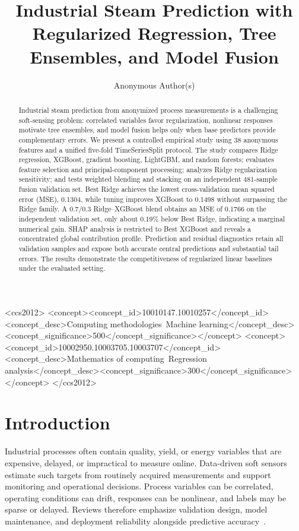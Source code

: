 \documentclass[sigconf,screen,review,anonymous]{acmart}
\title{Industrial Steam Prediction with Regularized Regression, Tree Ensembles, and Model Fusion}
\author{Anonymous Author(s)}
\begin{document}
\begin{abstract}
Industrial steam prediction from anonymized process measurements is a challenging soft-sensing problem: correlated variables favor regularization, nonlinear responses motivate tree ensembles, and model fusion helps only when base predictors provide complementary errors. We present a controlled empirical study using 38 anonymous features and a unified five-fold TimeSeriesSplit protocol. The study compares Ridge regression, XGBoost, gradient boosting, LightGBM, and random forests; evaluates feature selection and principal-component processing; analyzes Ridge regularization sensitivity; and tests weighted blending and stacking on an independent 481-sample fusion validation set. Best Ridge achieves the lowest cross-validation mean squared error (MSE), 0.1304, while tuning improves XGBoost to 0.1498 without surpassing the Ridge family. A 0.7/0.3 Ridge--XGBoost blend obtains an MSE of 0.1766 on the independent validation set, only about 0.19\% below Best Ridge, indicating a marginal numerical gain. SHAP analysis is restricted to Best XGBoost and reveals a concentrated global contribution profile. Prediction and residual diagnostics retain all validation samples and expose both accurate central predictions and substantial tail errors. The results demonstrate the competitiveness of regularized linear baselines under the evaluated setting.
\end{abstract}

\begin{CCSXML}
<ccs2012>
 <concept><concept_id>10010147.10010257</concept_id><concept_desc>Computing methodologies~Machine learning</concept_desc><concept_significance>500</concept_significance></concept>
 <concept><concept_id>10002950.10003705.10003707</concept_id><concept_desc>Mathematics of computing~Regression analysis</concept_desc><concept_significance>300</concept_significance></concept>
</ccs2012>
\end{CCSXML}

\maketitle

\section{Introduction}
Industrial processes often contain quality, yield, or energy variables that are expensive, delayed, or impractical to measure online. Data-driven soft sensors estimate such targets from routinely acquired measurements and support monitoring and operational decisions. Process variables can be correlated, operating conditions can drift, responses can be nonlinear, and labels may be sparse or delayed. Reviews therefore emphasize validation design, model maintenance, and deployment reliability alongside predictive accuracy~\cite{kadlec2009softsensor,yeo2023jit,sheng2024review,perera2023ai_softsensor}.
\end{document}
